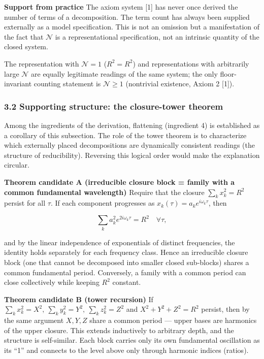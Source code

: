 \documentclass[
  a4paper,
]{article}
\begin{document}
\textbf{Support from practice} The axiom system {[}1{]} has never once
derived the number of terms of a decomposition. The term count has
always been supplied externally as a model specification. This is not an
omission but a manifestation of the fact that \(\mathcal N\) is a
representational specification, not an intrinsic quantity of the closed
system.

The representation with \(\mathcal N=1\) (\(R^2=R^2\)) and
representations with arbitrarily large \(\mathcal N\) are equally
legitimate readings of the same system; the only floor-invariant
counting statement is \(\mathcal N\ge1\) (nontrivial existence, Axiom 2
{[}1{]}).

\subsubsection{3.2 Supporting structure: the closure-tower
theorem}\label{supporting-structure-the-closure-tower-theorem}

Among the ingredients of the derivation, flattening (ingredient 4) is
established as a corollary of this subsection. The role of the tower
theorem is to characterize which externally placed decompositions are
dynamically consistent readings (the structure of reducibility).
Reversing this logical order would make the explanation circular.

\textbf{Theorem candidate A (irreducible closure block = family with a
common fundamental wavelength)} Require that the closure
\(\sum_k x_k^2=R^2\) persist for all \(\tau\). If each component
progresses as \(x_k(\tau)=a_ke^{i\omega_k\tau}\), then

\[
\sum_k a_k^2 e^{2i\omega_k\tau}=R^2\quad\forall\tau,
\]

and by the linear independence of exponentials of distinct frequencies,
the identity holds separately for each frequency class. Hence an
irreducible closure block (one that cannot be decomposed into smaller
closed sub-blocks) shares a common fundamental period. Conversely, a
family with a common period can close collectively while keeping \(R^2\)
constant.

\textbf{Theorem candidate B (tower recursion)} If
\(\sum_k x_k^2=X^2,\ \sum_k y_k^2=Y^2,\ \sum_k z_k^2=Z^2\) and
\(X^2+Y^2+Z^2=R^2\) persist, then by the same argument \(X,Y,Z\) share a
common period --- upper bases are harmonics of the upper closure. This
extends inductively to arbitrary depth, and the structure is
self-similar. Each block carries only its own fundamental oscillation as
its ``1'' and connects to the level above only through harmonic indices
(ratios).
\end{document}

